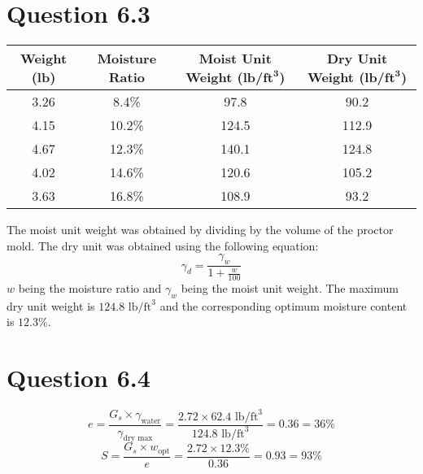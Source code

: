 \documentclass{article}
\begin{document}
\section*{Question 6.3}
\begin{center}
\begin{tabular}{|c|c|c|c|}
    \hline
    \textbf{Weight (lb)} & \textbf{Moisture Ratio} & \textbf{Moist Unit Weight (lb/$\bm{\textbf{ft}^3}$)} & \textbf{Dry Unit Weight (lb/$\bm{\textbf{ft}^3}$)}  \\\hline
    3.26          & 8.4\%                           & 97.8                                             & 90.2           \\\hline
    4.15          & 10.2\%                          & 124.5                                            & 112.9           \\\hline
    4.67          & 12.3\%                          & 140.1                                            & 124.8             \\\hline
    4.02          & 14.6\%                          & 120.6                                            & 105.2            \\\hline
    3.63          & 16.8\%                          & 108.9                                            & 93.2    \\\hline 
\end{tabular}
\end{center}
\vspace{3mm}
The moist unit weight was obtained by dividing by the volume of the proctor mold. The dry unit was obtained using the following equation: 
\[\gamma_d=\frac{\gamma_w}{1+\frac{w}{100}}\] 
$w$ being the moisture ratio and $\gamma_w$ being the moist unit weight. The maximum dry unit weight is $\boxed{124.8 \text{ lb}/\text{ft}^3}$ and the corresponding optimum moisture content is $\boxed{12.3\%}$.

\section*{Question 6.4}
\[e=\frac{G_s\times \gamma_\text{water}}{\gamma_{\text{dry max}}}=\frac{2.72\times 62.4\text{ lb}/\text{ft}^3}{124.8\text{ lb}/\text{ft}^3}=0.36=\boxed{36\%}\]
\[S=\frac{G_s\times w_\text{opt}}{e}=\frac{2.72\times 12.3\%}{0.36}=0.93=\boxed{93\%}\]
\end{document}
